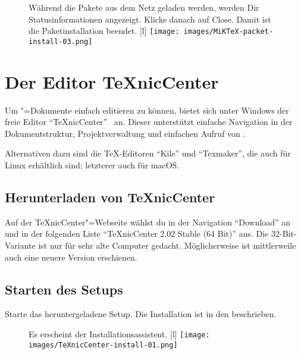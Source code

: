 \begin{figure}
	\begin{captionbeside}[Download]{%
			Während die Pakete aus dem Netz geladen werden, werden Dir Statusinformationen angezeigt. Klicke danach auf Close. Damit ist die Paketinstallation beendet.%
			\label{fig:install05b}}[l]
		\texttt{[image: images/MiKTeX-packet-install-03.png]}
	\end{captionbeside}
\end{figure}


\clearpage %

\section{Der Editor TeXnicCenter}

Um \DMLLaTeX"=Dokumente einfach editieren zu können, bietet sich unter Windows der freie Editor \enquote{TeXnicCenter}~\cite{TeXnicCenter} an. Dieser unterstützt einfache Navigation in der Dokumentstruktur, Projektverwaltung und einfachen Aufruf von \DMLLaTeX.

Alternativen dazu sind die TeX-Editoren \enquote{Kile} und \enquote{Texmaker}, die auch für Linux erhältlich sind; letzterer auch für macOS.

\subsection{Herunterladen von TeXnicCenter}

Auf der TeXnicCenter"=Webseite
wählst du in der Navigation \enquote{Download} an und in der folgenden Liste \enquote{TeXnicCenter 2.02 Stable (64 Bit)} aus. Die 32-Bit-Variante ist nur für sehr alte Computer gedacht. Möglicherweise ist mittlerweile auch eine neuere Version erschienen.

\subsection{Starten des Setups}

Starte das heruntergeladene Setup. Die Installation ist in den  beschrieben.

\begin{figure}[hb]
	\begin{captionbeside}{%
			Es erscheint der Installationsassistent.%
			\label{fig:install20}}[l]
		\texttt{[image: images/TeXnicCenter-install-01.png]}
	\end{captionbeside}
\end{figure}

